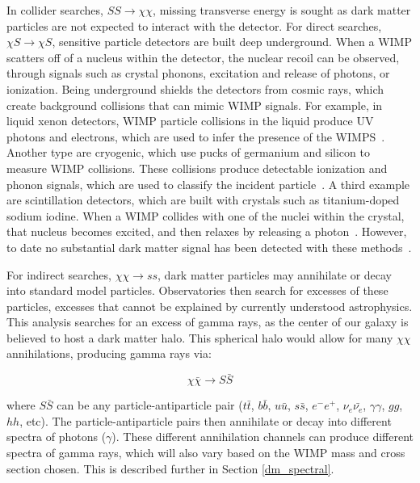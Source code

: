     In collider searches, $SS \rightarrow \chi\chi$, missing transverse energy is sought as dark matter particles are not expected to interact with the detector.
    For direct searches, $\chi S \rightarrow \chi S$, sensitive particle detectors are built deep underground.
    When a WIMP scatters off of a nucleus within the detector, the nuclear recoil can be observed, through signals such as crystal phonons, excitation and release of photons, or ionization.
    Being underground shields the detectors from cosmic rays, which create background collisions that can mimic WIMP signals.
    For example, in liquid xenon detectors, WIMP particle collisions in the liquid produce UV photons and electrons, which are used to infer the presence of the WIMPS~\cite{direct_lux,direct_xenon}.
    Another type are cryogenic, which use pucks of germanium and silicon to measure WIMP collisions.
    These collisions produce detectable ionization and phonon signals, which are used to classify the incident particle~\cite{direct_cdms}.
    A third example are scintillation detectors, which are built with crystals such as titanium-doped sodium iodine.
    When a WIMP collides with one of the nuclei within the crystal, that nucleus becomes excited, and then relaxes by releasing a photon~\cite{direct_dama}.
    However, to date no substantial dark matter signal has been detected with these methods~\cite{direct_dm_detection}.
    
    For indirect searches, $\chi\chi \rightarrow ss$, dark matter particles may annihilate or decay into standard model particles.
    Observatories then search for excesses of these particles, excesses that cannot be explained by currently understood astrophysics.
    This analysis searches for an excess of gamma rays, as the center of our galaxy is believed to host a dark matter halo.
    This spherical halo would allow for many $\chi\chi$ annihilations, producing gamma rays via: 
    
    $$\chi\bar{\chi} \rightarrow S\bar{S}$$

    where $S\bar{S}$ can be any particle-antiparticle pair ($t\bar{t}$, $b\bar{b}$, $u\bar{u}$, $s\bar{s}$, $e^{-}e^{+}$, $\nu_{e}\bar{\nu_{e}}$, $\gamma\gamma$, $gg$, $hh$, etc).
    The particle-antiparticle pairs then annihilate or decay into different spectra of photons ($\gamma$).
    These different annihilation channels can produce different spectra of gamma rays, which will also vary based on the WIMP mass and cross section chosen.
    This is described further in Section \ref{dm_spectral}.


